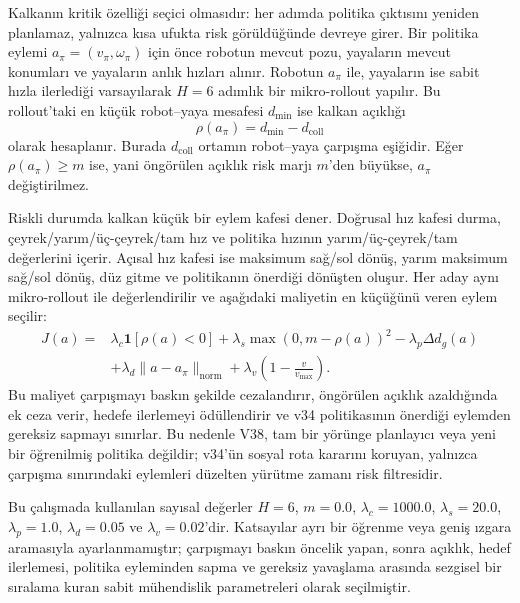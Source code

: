 \documentclass[conference]{IEEEtran}
\begin{document}
Kalkanın kritik özelliği seçici olmasıdır: her adımda politika çıktısını yeniden planlamaz, yalnızca kısa
ufukta risk görüldüğünde devreye girer. Bir politika eylemi $a_\pi=(v_\pi,\omega_\pi)$ için önce robotun
mevcut pozu, yayaların mevcut konumları ve yayaların anlık hızları alınır. Robotun $a_\pi$ ile, yayaların ise
sabit hızla ilerlediği varsayılarak $H=6$ adımlık bir mikro-rollout yapılır. Bu rollout'taki en küçük
robot--yaya mesafesi $d_{\min}$ ise kalkan açıklığı
\begin{equation}
\rho(a_\pi)=d_{\min}-d_{\mathrm{coll}}
\end{equation}
olarak hesaplanır. Burada $d_{\mathrm{coll}}$ ortamın robot--yaya çarpışma eşiğidir. Eğer
$\rho(a_\pi)\geq m$ ise, yani öngörülen açıklık risk marjı $m$'den büyükse, $a_\pi$ değiştirilmez.

Riskli durumda kalkan küçük bir eylem kafesi dener. Doğrusal hız kafesi durma, çeyrek/yarım/üç-çeyrek/tam
hız ve politika hızının yarım/üç-çeyrek/tam değerlerini içerir. Açısal hız kafesi ise maksimum sağ/sol dönüş,
yarım maksimum sağ/sol dönüş, düz gitme ve politikanın önerdiği dönüşten oluşur. Her aday aynı mikro-rollout
ile değerlendirilir ve aşağıdaki maliyetin en küçüğünü veren eylem seçilir:
\begin{equation}
\begin{split}
J(a) ={}& \lambda_c \mathbf{1}[\rho(a)<0]
+ \lambda_s \max(0,m-\rho(a))^2
- \lambda_p \Delta d_g(a) \\
&+ \lambda_d \|a-a_\pi\|_{\mathrm{norm}}
+ \lambda_v \left(1-\frac{v}{v_{\max}}\right).
\end{split}
\end{equation}
Bu maliyet çarpışmayı baskın şekilde cezalandırır, öngörülen açıklık azaldığında ek ceza verir, hedefe
ilerlemeyi ödüllendirir ve v34 politikasının önerdiği eylemden gereksiz sapmayı sınırlar. Bu nedenle V38,
tam bir yörünge planlayıcı veya yeni bir öğrenilmiş politika değildir; v34'ün sosyal rota kararını koruyan,
yalnızca çarpışma sınırındaki eylemleri düzelten yürütme zamanı risk filtresidir.

Bu çalışmada kullanılan sayısal değerler $H=6$, $m=0.0$, $\lambda_c=1000.0$, $\lambda_s=20.0$,
$\lambda_p=1.0$, $\lambda_d=0.05$ ve $\lambda_v=0.02$'dir. Katsayılar ayrı bir öğrenme veya geniş ızgara
aramasıyla ayarlanmamıştır; çarpışmayı baskın öncelik yapan, sonra açıklık, hedef ilerlemesi,
politika eyleminden sapma ve gereksiz yavaşlama arasında sezgisel bir sıralama kuran sabit mühendislik
parametreleri olarak seçilmiştir.
\end{document}
